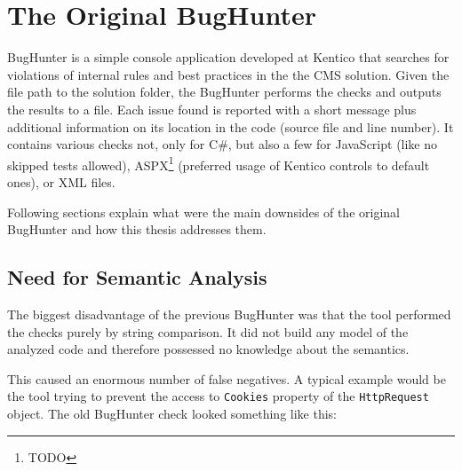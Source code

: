 \documentclass[
  digital, %
  table,   %
  lof,     %
  lot,     %
  oneside,
]{fithesis3}
\begin{document}



\section{The Original BugHunter}
BugHunter is a simple console application developed at Kentico that searches for violations of internal rules and best practices in the the CMS solution. Given the file path to the solution folder, the BugHunter performs the checks and outputs the results to a file. Each issue found is reported with a short message plus additional information on its location in the code (source file and line number). It contains various checks not, only for C\#, but also a few for JavaScript (like no skipped tests allowed), ASPX\footnote{TODO} (preferred usage of Kentico controls to default ones), or XML files.

Following sections explain what were the main downsides of the original BugHunter and how this thesis addresses them.

\subsection{Need for Semantic Analysis}
The biggest disadvantage of the previous BugHunter was that the tool performed the checks purely by string comparison. It did not build any model of the analyzed code and therefore possessed no knowledge about the semantics. 

This caused an enormous number of false negatives. A typical example would be the tool trying to prevent the access to \texttt{Cookies} property of the \texttt{HttpRequest} object. The old BugHunter check looked something like this:
\end{document}
